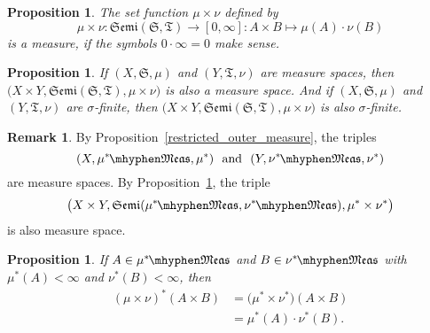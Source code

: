 \documentclass[
twoside=true,
paper=letter,
fontsize=9pt,
pagesize=auto,
leqno,
openany,
headsepline,
overfullrule,
]{scrbook}
\theoremstyle{plain}
\theoremstyle{plain}
\newtheorem{prop}[thm]{Proposition}
\theoremstyle{definition}
\newtheorem{rmk}[thm]{Remark}
\theoremstyle{bfnoteitalic}
\theoremstyle{bfnoteroman}
\newcommand{\sigalg}[1]{\mathfrak{#1}}
\newcommand{\textsigma}{\hbox{\large{$\sigma$}}\kern-1pt}
\newcommand{\semiring}{\sigalg{S}}
\newcommand{\semiringii}{\sigalg{T}}
\newcommand{\productsemiring}[2]{\mathfrak{Semi}(#1,#2)}
\newcommand{\measurable}[1]{{#1}\mhyphen\mathfrak{Meas}}
\newcommand{\kernast}{\ast\kern-1pt}
\newcommand{\measurespace}{X}
\newcommand{\measurespaceii}{Y}
\newcommand{\measure}{\mu}
\newcommand{\measureii}{\nu}
\newcommand{\seti}{A}
\newcommand{\setii}{B}
\begin{document}
 

 
 
 
 


 
 

 
 
 
\begin{prop}\label{product_measure}
The set function $\measure\times\measureii$ defined by
\[
\measure\times\measureii : 
\productsemiring{\semiring}{\semiringii} \to [0, \infty] :
\seti\times\setii \mapsto \measure(\seti)\cdot\measureii(\setii)
\]
is a measure, if the symbols $0\cdot\infty = 0$ make sense.
\end{prop}


\begin{prop}\label{product_measure_space}
If $(\measurespace, \semiring, \measure)$
and
$(\measurespaceii, \semiringii, \measureii)$
are measure spaces, then 
$\bigl(\measurespace\times\measurespaceii, 
\productsemiring{\semiring}{\semiringii}, 
\measure\times\measureii\bigr)$
is also a measure space.
And if
$(\measurespace, \semiring, \measure)$
and
$(\measurespaceii, \semiringii, \measureii)$ 
are \textsigma\hyp{}finite, then 
$\bigl(\measurespace\times\measurespaceii, 
\productsemiring{\semiring}{\semiringii}, 
\measure\times\measureii\bigr)$ is also \textsigma\hyp{}finite.
\end{prop}


\begin{rmk}
By Proposition~\ref{restricted_outer_measure}, the triples
\[
(\measurespace, \measurable{\measure^\kernast}, 
\measure^*)
\ \text{ and }\
(\measurespaceii, \measurable{\measureii^\kernast}, 
\measureii^*)
\]
are measure spaces. 
By Proposition~\ref{product_measure_space}, the triple
\[
\bigl(\measurespace\times\measurespaceii, 
\productsemiring{\measurable{\measure^\kernast}}{\measurable{\measureii^\kernast}}, 
\measure^*
\times
\measureii^*\bigr)
\]
is also measure space. 
\end{rmk}



\begin{prop}\label{outer_product_measure}
If $\seti\in\measurable{\measure^\kernast}$ and 
$\setii\in\measurable{\measureii^\kernast}$ with  
$\measure^*(\seti)<\infty$ and
$\measureii^*(\setii)<\infty$, then
\begin{align*}
(\measure\times\measureii)^*(\seti\times\setii)
&=
\bigl(
\measure^*
\times
\measureii^*
\bigr)
(\seti\times\setii)\\
&=
\measure^*(\seti)
\cdot
\measureii^*(\setii).
\end{align*}
\end{prop}
\end{document}
